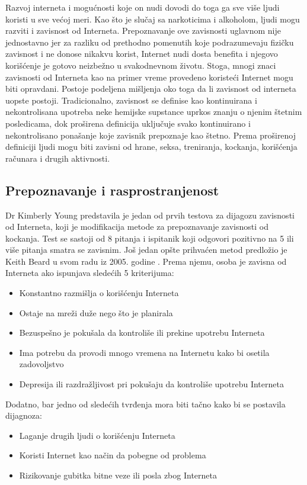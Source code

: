 \documentclass[a4paper]{article}
\begin{document}
Razvoj interneta i mogućnosti koje on nudi dovodi do toga ga sve više ljudi koristi u sve većoj meri.
Kao što je slučaj sa narkoticima i alkoholom, ljudi mogu razviti i zavisnost od Interneta. Prepoznavanje ove zavisnosti uglavnom nije jednostavno jer za razliku od prethodno pomenutih koje podrazumevaju fizičku zavisnost i ne donose nikakvu korist, Internet nudi dosta benefita i njegovo korišćenje je gotovo neizbežno u svakodnevnom životu. Stoga, mnogi znaci zavisnosti od Interneta kao na primer vreme provedeno koristeći Internet mogu biti opravdani. Postoje podeljena mišljenja oko toga da li zavisnost od interneta uopste postoji. Tradicionalno, zavisnost se definise kao kontinuirana i nekontrolisana upotreba neke hemijske supstance uprkos znanju o njenim štetnim posledicama, dok proširena definicija uključuje svako  kontinuirano i nekontrolisano ponašanje koje zavisnik prepoznaje kao štetno. Prema proširenoj definiciji ljudi mogu biti zavisni od hrane, seksa, treniranja, kockanja, korišćenja računara i drugih aktivnosti.\cite{ethics}

\subsection{Prepoznavanje i rasprostranjenost}
\label{subsec:podnaslovZI1}

Dr Kimberly Young predstavila je jedan od prvih testova za dijagozu zavisnosti od Interneta, koji je modifikacija metode za prepoznavanje zavisnosti od kockanja. Test se sastoji od 8 pitanja i ispitanik koji odgovori pozitivno na 5 ili više pitanja smatra se zavisnim. \cite{ethics}
Još jedan opšte prihvaćen metod predložio je Keith Beard u svom radu iz 2005. godine \cite{diagnostic}. Prema njemu, osoba je zavisna od Interneta ako ispunjava sledećih 5 kriterijuma:
\begin{itemize}
  \item Konstantno razmišlja o korišćenju Interneta
  \item Ostaje na mreži duže nego što je planirala
  \item Bezuspešno je pokušala da kontroliše ili prekine upotrebu Interneta
  \item Ima potrebu da provodi mnogo vremena na Internetu kako bi osetila zadovoljstvo
  \item Depresija ili razdražljivost pri pokušaju da kontroliše upotrebu Interneta
\end{itemize}

Dodatno, bar jedno od sledećih tvrđenja mora biti tačno kako bi se postavila dijagnoza:
\begin{itemize}
  \item Laganje drugih ljudi o korišćenju Interneta
  \item Koristi Internet kao način da pobegne od problema
  \item Rizikovanje gubitka bitne veze ili posla zbog Interneta
\end{itemize}
\end{document}
